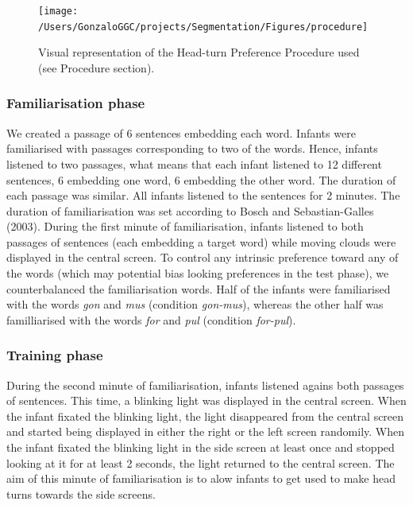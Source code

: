 \documentclass[man,floatsintext]{apa6}
\begin{document}
\begin{figure}
\texttt{[image: /Users/GonzaloGGC/projects/Segmentation/Figures/procedure]} \caption{Visual representation of the Head-turn Preference Procedure used (see Procedure section).}\label{fig:procedure}
\end{figure}

\hypertarget{familiarisation-phase}{%
\subsubsection{Familiarisation phase}\label{familiarisation-phase}}

We created a passage of 6 sentences embedding each word. Infants were familiarised with passages corresponding to two of the words. Hence, infants listened to two passages, what means that each infant listened to 12 different sentences, 6 embedding one word, 6 embedding the other word. The duration of each passage was similar. All infants listened to the sentences for 2 minutes. The duration of familiarisation was set according to Bosch and Sebastian-Galles (2003). During the first minute of familiarisation, infants listened to both passages of sentences (each embedding a target word) while moving clouds were displayed in the central screen. To control any intrinsic preference toward any of the words (which may potential bias looking preferences in the test phase), we counterbalanced the familiarisation words. Half of the infants were familiarised with the words \emph{gon} and \emph{mus} (condition \emph{gon-mus}), whereas the other half was familliarised with the words \emph{for} and \emph{pul} (condition \emph{for-pul}).

\hypertarget{training-phase}{%
\subsubsection{Training phase}\label{training-phase}}

During the second minute of familiarisation, infants listened agains both passages of sentences. This time, a blinking light was displayed in the central screen. When the infant fixated the blinking light, the light disappeared from the central screen and started being displayed in either the right or the left screen randomily. When the infant fixated the blinking light in the side screen at least once and stopped looking at it for at least 2 seconds, the light returned to the central screen. The aim of this minute of familiarisation is to alow infants to get used to make head turns towards the side screens.
\end{document}
